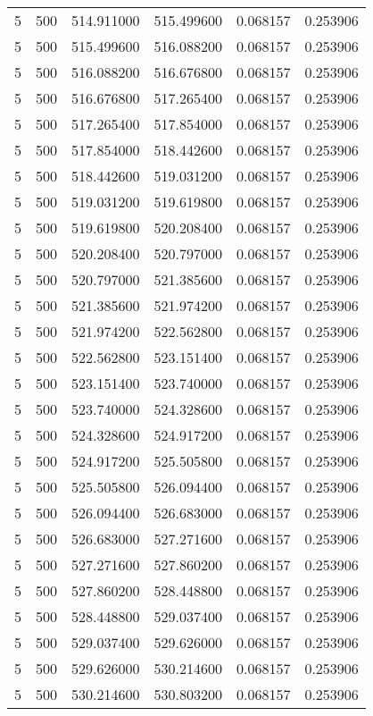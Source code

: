 \begin{longtable}{rrrrrr}
5 & 500 & 514.911000 & 515.499600 & 0.068157 & 0.253906 \\
5 & 500 & 515.499600 & 516.088200 & 0.068157 & 0.253906 \\
5 & 500 & 516.088200 & 516.676800 & 0.068157 & 0.253906 \\
5 & 500 & 516.676800 & 517.265400 & 0.068157 & 0.253906 \\
5 & 500 & 517.265400 & 517.854000 & 0.068157 & 0.253906 \\
5 & 500 & 517.854000 & 518.442600 & 0.068157 & 0.253906 \\
5 & 500 & 518.442600 & 519.031200 & 0.068157 & 0.253906 \\
5 & 500 & 519.031200 & 519.619800 & 0.068157 & 0.253906 \\
5 & 500 & 519.619800 & 520.208400 & 0.068157 & 0.253906 \\
5 & 500 & 520.208400 & 520.797000 & 0.068157 & 0.253906 \\
5 & 500 & 520.797000 & 521.385600 & 0.068157 & 0.253906 \\
5 & 500 & 521.385600 & 521.974200 & 0.068157 & 0.253906 \\
5 & 500 & 521.974200 & 522.562800 & 0.068157 & 0.253906 \\
5 & 500 & 522.562800 & 523.151400 & 0.068157 & 0.253906 \\
5 & 500 & 523.151400 & 523.740000 & 0.068157 & 0.253906 \\
5 & 500 & 523.740000 & 524.328600 & 0.068157 & 0.253906 \\
5 & 500 & 524.328600 & 524.917200 & 0.068157 & 0.253906 \\
5 & 500 & 524.917200 & 525.505800 & 0.068157 & 0.253906 \\
5 & 500 & 525.505800 & 526.094400 & 0.068157 & 0.253906 \\
5 & 500 & 526.094400 & 526.683000 & 0.068157 & 0.253906 \\
5 & 500 & 526.683000 & 527.271600 & 0.068157 & 0.253906 \\
5 & 500 & 527.271600 & 527.860200 & 0.068157 & 0.253906 \\
5 & 500 & 527.860200 & 528.448800 & 0.068157 & 0.253906 \\
5 & 500 & 528.448800 & 529.037400 & 0.068157 & 0.253906 \\
5 & 500 & 529.037400 & 529.626000 & 0.068157 & 0.253906 \\
5 & 500 & 529.626000 & 530.214600 & 0.068157 & 0.253906 \\
5 & 500 & 530.214600 & 530.803200 & 0.068157 & 0.253906 \\

\end{longtable}
